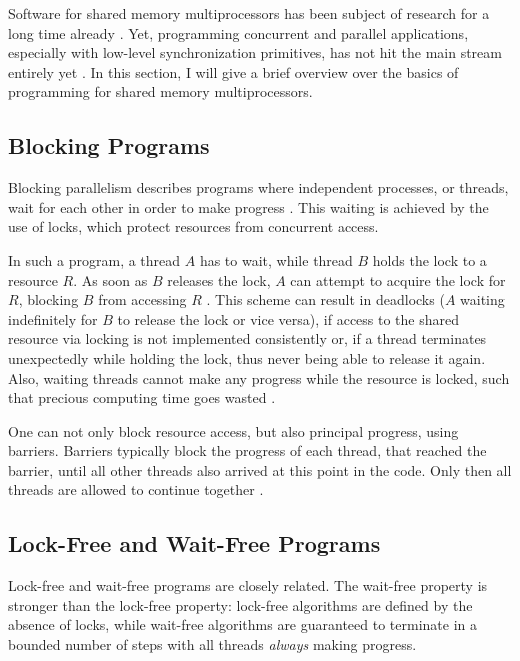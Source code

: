 Software for shared memory multiprocessors has been subject of research for a
long time already \cite{Herlihy2008Art}. Yet, programming concurrent and
parallel applications, especially with low-level synchronization primitives, has
not hit the main stream entirely yet \cite{Herlihy2008Art}. In this section, I
will give a brief overview over the basics of programming for shared memory
multiprocessors.

\subsection{Blocking Programs}
\label{sec:introduction-blocking}

Blocking parallelism describes programs where independent processes, or threads,
wait for each other in order to make progress \cite{Herlihy2008Art}. This
waiting is achieved by the use of locks, which protect resources from concurrent
access.

In such a program, a thread $A$ has to wait, while thread $B$ holds the lock to a
resource $R$. As soon as $B$ releases the lock, $A$ can attempt to acquire the
lock for $R$, blocking $B$ from accessing $R$ \cite{Herlihy2008Art}. This scheme
can result in deadlocks ($A$ waiting indefinitely for $B$ to release the lock or
vice versa), if access to the shared resource via locking is not implemented
consistently or, if a thread terminates unexpectedly while holding the lock, thus
never being able to release it again. Also, waiting threads cannot make any
progress while the resource is locked, such that precious computing time goes
wasted \cite{Herlihy2008Art}.

One can not only block resource access, but also principal progress, using
barriers. Barriers typically block the progress of each thread, that reached the
barrier, until all other threads also arrived at this point in the code. Only
then all threads are allowed to continue together \cite{Herlihy2008Art}.

\subsection{Lock-Free and Wait-Free Programs}
\label{sec:introduction-wf-primitives}

Lock-free and wait-free programs are closely related. The wait-free property is
stronger than the lock-free property: lock-free algorithms are defined by the
absence of locks, while wait-free algorithms are guaranteed to terminate in a
bounded number of steps \cite{Alistarh2013Are} with all threads \emph{always}
making progress.

